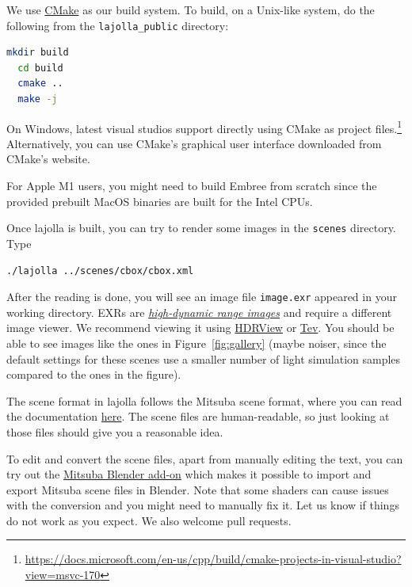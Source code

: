 We use \href{https://cmake.org/}{CMake} as our build system. To build, on a Unix-like system, do the following from the \lstinline{lajolla_public} directory:

\begin{lstlisting}[language=bash]
  mkdir build
  cd build
  cmake ..
  make -j
\end{lstlisting}

On Windows, latest visual studios support directly using CMake as project files.\footnote{\url{https://docs.microsoft.com/en-us/cpp/build/cmake-projects-in-visual-studio?view=msvc-170}} Alternatively, you can use CMake's graphical user interface downloaded from CMake's website. 

For Apple M1 users, you might need to build Embree from scratch since the provided prebuilt MacOS binaries are built for the Intel CPUs.


Once lajolla is built, you can try to render some images in the \lstinline{scenes} directory. Type
\begin{lstlisting}[language=bash]
  ./lajolla ../scenes/cbox/cbox.xml
\end{lstlisting}

After the reading is done, you will see an image file \lstinline{image.exr} appeared in your working directory. EXRs are \href{https://en.wikipedia.org/wiki/High_dynamic_range}{\emph{high-dynamic range images}} and require a different image viewer. We recommend viewing it using \href{https://github.com/wkjarosz/hdrview}{HDRView} or \href{https://github.com/Tom94/tev}{Tev}. You should be able to see images like the ones in Figure~\ref{fig:gallery} (maybe noiser, since the default settings for these scenes use a smaller number of light simulation samples compared to the ones in the figure).

The scene format in lajolla follows the Mitsuba scene format, where you can read the documentation \href{https://www.mitsuba-renderer.org/releases/current/documentation.pdf}{here}.
The scene files are human-readable, so just looking at those files should give you a reasonable idea.

To edit and convert the scene files, apart from manually editing the text, you can try out the \href{https://github.com/mitsuba-renderer/mitsuba-blender}{Mitsuba Blender add-on} which makes it possible to import and export Mitsuba scene files in Blender. Note that some shaders can cause issues with the conversion and you might need to manually fix it. Let us know if things do not work as you expect. We also welcome pull requests.

